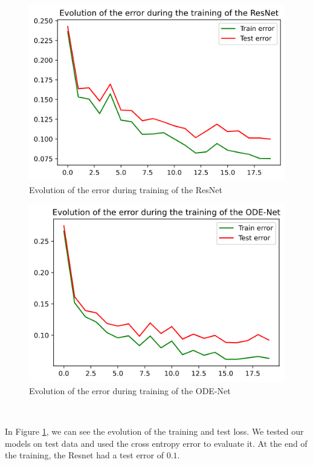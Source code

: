 \documentclass[10pt,a4paper]{article}
\theoremstyle{definition}
\theoremstyle{plain}
\begin{document}
\begin{figure}[!h]
\center
\includegraphics[scale=0.5]{resnet_rd_loss.png}
\caption{Evolution of the error during training of the ResNet}
\label{resnet_rd}
\end{figure}

\begin{figure}[!h]
\center
\includegraphics[scale=0.5]{odenet_rd_loss.png}
\caption{Evolution of the error during training of the ODE-Net}
\label{odenet_rd}
\end{figure}

~

In Figure \ref{resnet_rd}, we can see the evolution of the training and test loss. We tested our models on test data and used the cross entropy error to evaluate it. At the end of the training, the Resnet had a test error of $0.1$.
\end{document}
